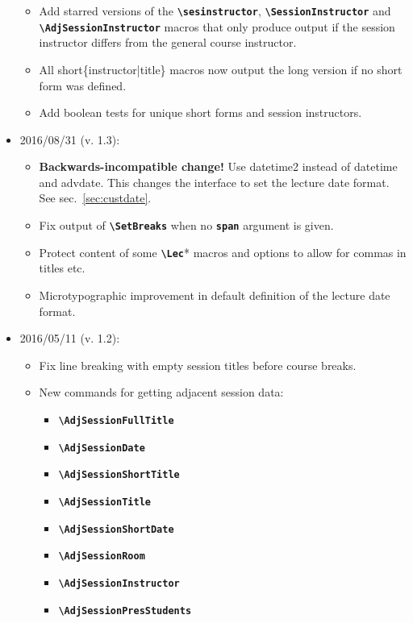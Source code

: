 \documentclass[english]{article}
\newcommand*\jmacro[1]{\textbf{\texttt{#1}}}
\newcommand*\jcsmacro[1]{\jmacro{\textbackslash{#1}}}
\newcommand*\joption[1]{\textbf{\texttt{#1}}}
\begin{document}
\begin{itemize}
\begin{itemize}
		\item Add starred versions of the \jcsmacro{sesinstructor}, \jcsmacro{SessionInstructor} and \jcsmacro{AdjSessionInstructor} macros that only produce output if the session instructor differs from the general course instructor.
		\item All short\{instructor|title\} macros now output the long version if no short form was defined.
		\item Add boolean tests for unique short forms and session instructors.
	\end{itemize}
\item 2016/08/31 (v. 1.3):
     \begin{itemize}
     	\item \textbf{Backwards-incompatible change!} Use \textsf{datetime2} instead of \textsf{datetime} and \textsf{advdate}.
     	      This changes the interface to set the lecture date format. See sec.~\ref{sec:custdate}.
     	\item Fix output of \jcsmacro{SetBreaks} when no \joption{span} argument is given.
     	\item Protect content of some \jcsmacro{Lec}* macros and options to allow for commas in
     	      titles etc.
        \item Microtypographic improvement in default definition of the lecture date format.
	 \end{itemize}
\item 2016/05/11 (v. 1.2):
    \begin{itemize}	
	\item Fix line breaking with empty session titles before course breaks. 
	\item New commands for getting adjacent session data:
	   \begin{itemize}	
		  \item \jcsmacro{AdjSessionFullTitle}
		  \item \jcsmacro{AdjSessionDate}
		  \item \jcsmacro{AdjSessionShortTitle}
		  \item \jcsmacro{AdjSessionTitle}
		  \item \jcsmacro{AdjSessionShortDate}
		  \item \jcsmacro{AdjSessionRoom}
		  \item \jcsmacro{AdjSessionInstructor}\enlargethispage{\baselineskip}
		  \item \jcsmacro{AdjSessionPresStudents}
	  \end{itemize}
    \end{itemize}

\end{itemize}
\end{document}
